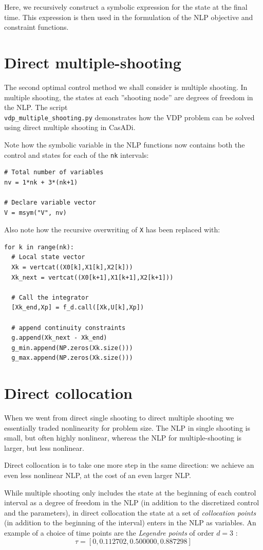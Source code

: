 \documentclass[a4paper,12pt]{book}
\begin{document}
{Here, we recursively construct a symbolic expression for the state at the final time. This expression is then used in the formulation of the NLP objective and constraint functions.

\section{Direct multiple-shooting}
The second optimal control method we shall consider is multiple shooting. In multiple shooting, the states at each ''shooting node'' are degrees of freedom in the NLP. The script \\ \texttt{vdp\_multiple\_shooting.py} demonstrates how the VDP problem can be solved using direct multiple shooting in CasADi.

Note how the symbolic variable in the NLP functions now contains both the control and states for each of the \texttt{nk} intervals:
\begin{verbatim}
# Total number of variables
nv = 1*nk + 3*(nk+1)

# Declare variable vector
V = msym("V", nv)
\end{verbatim}

Also note how the recursive overwriting of \texttt{X} has been replaced with:
\begin{verbatim}
for k in range(nk):
  # Local state vector
  Xk = vertcat((X0[k],X1[k],X2[k]))
  Xk_next = vertcat((X0[k+1],X1[k+1],X2[k+1]))
  
  # Call the integrator
  [Xk_end,Xp] = f_d.call([Xk,U[k],Xp])
  
  # append continuity constraints
  g.append(Xk_next - Xk_end)
  g_min.append(NP.zeros(Xk.size()))
  g_max.append(NP.zeros(Xk.size()))
\end{verbatim}

\section{Direct collocation}
When we went from direct single shooting to direct multiple shooting we essentially traded nonlinearity for problem size. The NLP in single shooting is small, but often highly nonlinear, whereas the NLP for multiple-shooting is larger, but less nonlinear.

Direct collocation is to take one more step in the same direction: we achieve an even less nonlinear NLP, at the cost of an even larger NLP.

While multiple shooting only includes the state at the beginning of each control interval as a degree of freedom in the NLP (in addition to the discretized control and the parameters), in direct collocation the state at a set of \emph{collocation points} (in addition to the beginning of the interval) enters in the NLP as variables. An example of a choice of time points are the \emph{Legendre points} of order $d=3$ :
\begin{equation}
 \tau = [0,0.112702,0.500000,0.887298]
\end{equation}

}
\end{document}
